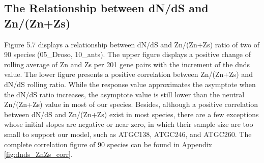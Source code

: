 \subsection{The Relationship between dN/dS and Zn/(Zn+Zs)}
Figure 5.7 displays a relationship between dN/dS and Zn/(Zn+Zs) ratio of two of 90 species (05\_Droso, 10\_ants). The upper figure displays a positive change of rolling average of Zn and Zs per 201 gene pairs with the increment of the dnds value. The lower figure presents a positive correlation between Zn/(Zn+Zs) and dN/dS rolling ratio. While the response value approximates the asymptote when the dN/dS ratio increases, the asymptote value is still lower than the neutral Zn/(Zn+Zs) value in most of our species. Besides, although a positive correlation between dN/dS and Zn/(Zn+Zs) exist in most species, there are a few exceptions whose initial slopes are negative or near zero, in which their sample size are too small to support our model, such as ATGC138, ATGC246, and ATGC260. The complete correlation figure of 90 species can be found in Appendix \ref{fig:dnds_ZnZs_corr}.  
